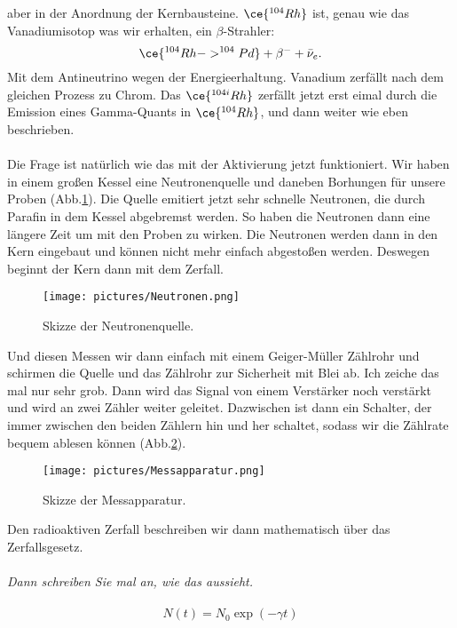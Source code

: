 aber in der Anordnung der Kernbausteine. $\ce{^{104}Rh}$ ist, genau wie das Vanadiumisotop was wir erhalten, ein $\beta$-Strahler: 
\begin{equation}
    \ce{^{104}Rh -> ^{104}Pd}+\beta^-+\bar{\nu}_e. 
\end{equation}
Mit dem Antineutrino wegen der Energieerhaltung. Vanadium zerfällt nach dem gleichen Prozess zu Chrom. 
Das $\ce{^{104i}Rh}$ zerfällt jetzt erst eimal durch die Emission eines Gamma-Quants in $\ce{^{104}Rh}$, und dann weiter wie eben beschrieben. 
\\\\\noindent
Die Frage ist natürlich wie das mit der Aktivierung jetzt funktioniert. Wir haben in einem großen Kessel eine Neutronenquelle und daneben
Borhungen für unsere Proben (Abb.\ref{fig:Kessel}). Die Quelle emitiert jetzt sehr schnelle Neutronen, die durch Parafin in dem Kessel abgebremst
werden. So haben die Neutronen dann eine längere Zeit um mit den Proben zu wirken. Die Neutronen werden dann in den Kern eingebaut und können
nicht mehr einfach abgestoßen werden. Deswegen beginnt der Kern dann mit dem Zerfall. 
\begin{figure}[H]
    \centering
    \texttt{[image: pictures/Neutronen.png]}
    \caption{Skizze der Neutronenquelle. \cite{AP04}}
    \label{fig:Kessel}
  \end{figure}
\noindent
Und diesen Messen wir dann einfach mit einem Geiger-Müller 
Zählrohr und schirmen die Quelle und das Zählrohr zur Sicherheit mit Blei ab. Ich zeiche das mal nur sehr grob. Dann wird das Signal von
einem Verstärker noch verstärkt und wird an zwei Zähler weiter geleitet. Dazwischen ist dann ein Schalter, der immer zwischen den beiden Zählern
hin und her schaltet, sodass wir die Zählrate bequem ablesen können (Abb.\ref{fig:Apparatur}). 
\begin{figure}[H]
    \centering
    \texttt{[image: pictures/Messapparatur.png]}
    \caption{Skizze der Messapparatur. \cite{AP04}}
    \label{fig:Apparatur}
  \end{figure}
\noindent
Den radioaktiven Zerfall beschreiben wir dann mathematisch über das Zerfallsgesetz. 
\\\\\noindent
\textit{Dann schreiben Sie mal an, wie das aussieht.}
\\\\\noindent
\begin{equation}
    N(t)=N_0\exp(-\gamma t)
\end{equation}
